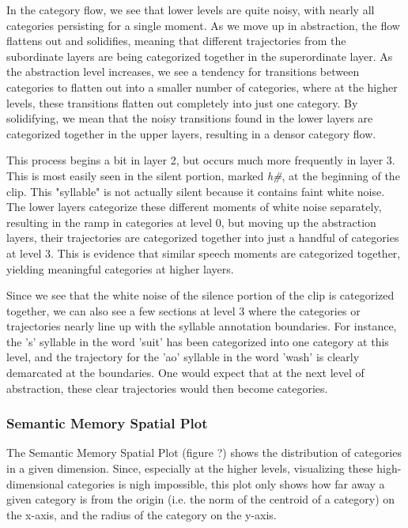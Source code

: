 \documentclass[runningheads]{llncs}
\begin{document}
In the category flow, we see that lower levels are quite noisy, with nearly all categories persisting for a single moment.  As we move up in abstraction, the flow flattens out and solidifies, meaning that different trajectories from the subordinate layers are being categorized together in the superordinate layer.  As the abstraction level increases, we see a tendency for transitions between categories to flatten out into a smaller number of categories, where at the higher levels, these transitions flatten out completely into just one category.  By solidifying, we mean that the noisy transitions found in the lower layers are categorized together in the upper layers, resulting in a densor category flow.

This process begins a bit in layer 2, but occurs much more frequently in layer 3.  This is most easily seen in the silent portion, marked \textit{h\#}, at the beginning of the clip.  This "syllable" is not actually silent because it contains faint white noise.  The lower layers categorize these different moments of white noise separately, resulting in the ramp in categories at level 0, but moving up the abstraction layers, their trajectories are categorized together into just a handful of categories at level 3.  This is evidence that similar speech moments are categorized together, yielding meaningful categories at higher layers.

Since we see that the white noise of the silence portion of the clip is categorized together, we can also see a few sections at level 3 where the categories or trajectories nearly line up with the syllable annotation boundaries.  For instance, the 's' syllable in the word 'suit' has been categorized into one category at this level, and the trajectory for the 'ao' syllable in the word 'wash' is clearly demarcated at the boundaries.  One would expect that at the next level of abstraction, these clear trajectories would then become categories.

\subsubsection{Semantic Memory Spatial Plot}

The Semantic Memory Spatial Plot (figure ?) shows the distribution of categories in a given dimension.  Since, especially at the higher levels, visualizing these high-dimensional categories is nigh impossible, this plot only shows how far away a given category is from the origin (i.e. the norm of the centroid of a category) on the x-axis, and the radius of the category on the y-axis.
\end{document}
